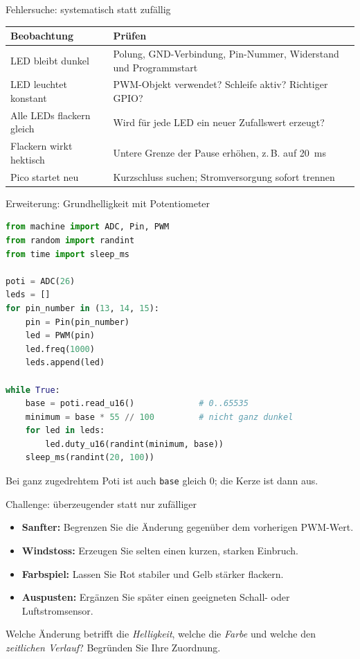\begin{frame}{Fehlersuche: systematisch statt zufällig}
	\begin{tabularx}{\textwidth}{@{}lX@{}}
		\toprule
		\textbf{Beobachtung} & \textbf{Prüfen} \\
		\midrule
		LED bleibt dunkel & Polung, GND-Verbindung, Pin-Nummer, Widerstand und Programmstart \\
		LED leuchtet konstant & PWM-Objekt verwendet? Schleife aktiv? Richtiger GPIO? \\
		Alle LEDs flackern gleich & Wird für jede LED ein neuer Zufallswert erzeugt? \\
		Flackern wirkt hektisch & Untere Grenze der Pause erhöhen, z.\,B. auf \qty{20}{\milli\second} \\
		Pico startet neu & Kurzschluss suchen; Stromversorgung sofort trennen \\
		\bottomrule
	\end{tabularx}
\end{frame}

\begin{frame}[fragile]{Erweiterung: Grundhelligkeit mit Potentiometer}
\begin{lstlisting}[language=Python]
from machine import ADC, Pin, PWM
from random import randint
from time import sleep_ms

poti = ADC(26)
leds = []
for pin_number in (13, 14, 15):
    pin = Pin(pin_number)
    led = PWM(pin)
    led.freq(1000)
    leds.append(led)

while True:
    base = poti.read_u16()             # 0..65535
    minimum = base * 55 // 100         # nicht ganz dunkel
    for led in leds:
        led.duty_u16(randint(minimum, base))
    sleep_ms(randint(20, 100))
\end{lstlisting}
	Bei ganz zugedrehtem Poti ist auch \lstinline|base| gleich $0$; die Kerze ist dann aus.
\end{frame}

\begin{frame}{Challenge: überzeugender statt nur zufälliger}
	\begin{itemize}[<+->]
		\item \textbf{Sanfter:} Begrenzen Sie die Änderung gegenüber dem vorherigen PWM-Wert.
		\item \textbf{Windstoss:} Erzeugen Sie selten einen kurzen, starken Einbruch.
		\item \textbf{Farbspiel:} Lassen Sie Rot stabiler und Gelb stärker flackern.
		\item \textbf{Auspusten:} Ergänzen Sie später einen geeigneten Schall- oder Luftstromsensor.
	\end{itemize}
	\pause
	\begin{myexercise}
		Welche Änderung betrifft die \emph{Helligkeit}, welche die \emph{Farbe} und welche den
		\emph{zeitlichen Verlauf}? Begründen Sie Ihre Zuordnung.
	\end{myexercise}
\end{frame}

